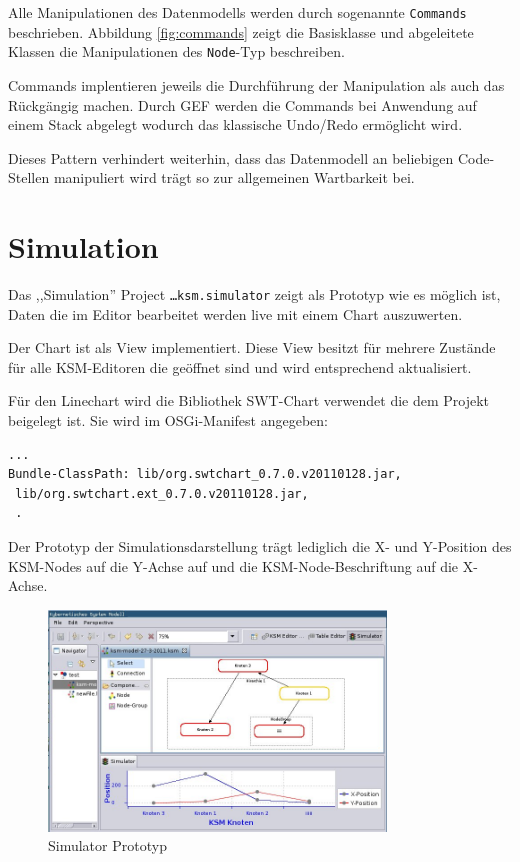 \documentclass[%
12pt,titlepage,abstracton,DIV=10]{scrreprt}
\begin{document}
Alle Manipulationen des Datenmodells werden durch sogenannte \texttt{Commands}
beschrieben. Abbildung \ref{fig:commands} zeigt die Basisklasse und abgeleitete
Klassen die Manipulationen des \texttt{Node}-Typ beschreiben.

Commands implentieren jeweils die Durchführung der Manipulation als auch das
Rückgängig machen. Durch GEF werden die Commands bei Anwendung auf einem Stack
abgelegt wodurch das klassische Undo/Redo ermöglicht wird.

Dieses Pattern verhindert weiterhin, dass das Datenmodell an beliebigen
Code-Stellen manipuliert wird trägt so zur allgemeinen Wartbarkeit bei.










\section{Simulation}
Das ,,Simulation'' Project \texttt{\ldots ksm.simulator} zeigt als Prototyp wie
es möglich ist, Daten die im Editor bearbeitet werden live mit einem Chart
auszuwerten.

Der Chart ist als View implementiert. Diese View besitzt für mehrere Zustände
für alle KSM-Editoren die geöffnet sind und wird entsprechend aktualisiert.

Für den Linechart wird die Bibliothek SWT-Chart verwendet die dem Projekt
beigelegt ist. Sie wird im OSGi-Manifest angegeben:
{\small\begin{verbatim}
...
Bundle-ClassPath: lib/org.swtchart_0.7.0.v20110128.jar,
 lib/org.swtchart.ext_0.7.0.v20110128.jar,
 .
\end{verbatim}}

Der Prototyp der Simulationsdarstellung trägt lediglich die X- und Y-Position
des KSM-Nodes auf die Y-Achse auf und die KSM-Node-Beschriftung auf die X-Achse.

\begin{figure}[ht!]
\centering
\includegraphics[width=0.8\textwidth]{images/eclipse-simulator.jpg}
\caption{Simulator Prototyp}
\label{fig:eclipse-simulator}
\end{figure}
\end{document}
